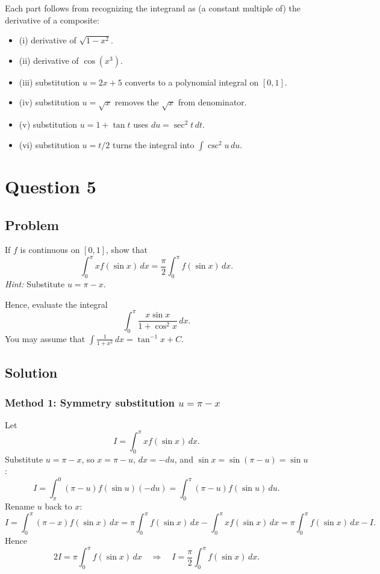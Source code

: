 \documentclass[12pt]{article}
\begin{document}
Each part follows from recognizing the integrand as (a constant multiple of) the derivative of a composite:
\begin{itemize}[leftmargin=*]
\item (i) derivative of \(\sqrt{1-x^2}\).
\item (ii) derivative of \(\cos(x^3)\).
\item (iii) substitution \(u=2x+5\) converts to a polynomial integral on \([0,1]\).
\item (iv) substitution \(u=\sqrt{x}\) removes the \(\sqrt{x}\) from denominator.
\item (v) substitution \(u=1+\tan t\) uses \(du=\sec^2 t\,dt\).
\item (vi) substitution \(u=t/2\) turns the integral into \(\int \csc^2 u\,du\).
\end{itemize}

\bigskip


\newpage

\section*{Question 5}

\subsection*{Problem}

If \(f\) is continuous on \([0,1]\), show that
\[
\int_{0}^{\pi} x f(\sin x)\,dx = \frac{\pi}{2}\int_{0}^{\pi} f(\sin x)\,dx.
\]
\textit{Hint:} Substitute \(u=\pi-x\).

Hence, evaluate the integral
\[
\int_{0}^{\pi}\frac{x\sin x}{1+\cos^2 x}\,dx.
\]
You may assume that \(\displaystyle \int \frac{1}{1+x^2}\,dx=\tan^{-1}x + C\).

\subsection*{Solution}

\subsubsection*{Method 1: Symmetry substitution \(u=\pi-x\)}

Let
\[
I=\int_{0}^{\pi} x f(\sin x)\,dx.
\]
Substitute \(u=\pi-x\), so \(x=\pi-u\), \(dx=-du\), and \(\sin x=\sin(\pi-u)=\sin u\):
\[
I=\int_{\pi}^{0} (\pi-u) f(\sin u)(-du)=\int_{0}^{\pi} (\pi-u) f(\sin u)\,du.
\]
Rename \(u\) back to \(x\):
\[
I=\int_{0}^{\pi} (\pi-x) f(\sin x)\,dx
=\pi\int_{0}^{\pi} f(\sin x)\,dx - \int_{0}^{\pi} x f(\sin x)\,dx
=\pi\int_{0}^{\pi} f(\sin x)\,dx - I.
\]
Hence
\[
2I=\pi\int_{0}^{\pi} f(\sin x)\,dx
\quad\Rightarrow\quad
I=\frac{\pi}{2}\int_{0}^{\pi} f(\sin x)\,dx.
\]
\end{document}
